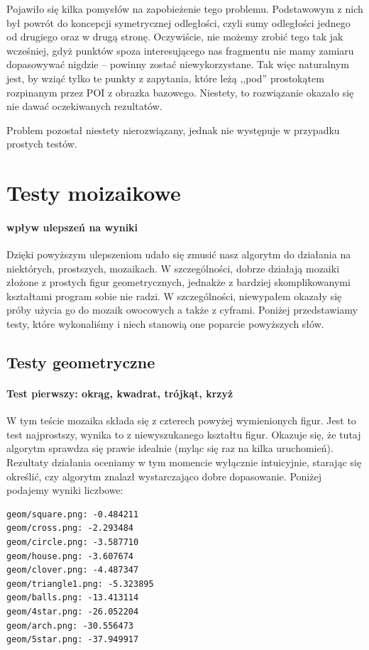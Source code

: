 \documentclass[a4paper,12pt,leqno]{article}
\begin{document}
Pojawiło się kilka pomysłów na zapobieżenie tego problemu. Podstawowym z nich był powrót do koncepcji symetrycznej odległości, czyli sumy odległości jednego od drugiego oraz w drugą stronę.
Oczywiście, nie możemy zrobić tego tak jak wcześniej, gdyż punktów spoza interesującego nas fragmentu nie mamy zamiaru dopasowywać nigdzie -- powinny zostać niewykorzystane.
Tak więc naturalnym jest, by wziąć tylko te punkty z zapytania, które leżą ,,pod'' prostokątem rozpinanym przez POI z obrazka bazowego. Niestety, to rozwiązanie okazało się nie dawać 
oczekiwanych rezultatów.

Problem pozostał niestety nierozwiązany, jednak nie występuje w przypadku prostych testów.

\section{Testy moizaikowe}
\paragraph{wpływ ulepszeń na wyniki}
Dzięki powyższym ulepszeniom udało się zmusić nasz algorytm do działania na niektórych, prostszych, mozaikach. W szczególności, dobrze działają mozaiki złożone z prostych figur geometrycznych,
jednakże z bardziej skomplikowanymi kształtami program sobie nie radzi. W szczególności, niewypałem okazały się próby użycia go do mozaik owocowych a także z cyframi.
Poniżej przedstawiamy testy, które wykonaliśmy i niech stanowią one poparcie powyższych słów.

\subsection{Testy geometryczne}
\paragraph{Test pierwszy: okrąg, kwadrat, trójkąt, krzyż}
W tym teście mozaika składa się z czterech powyżej wymienionych figur. Jest to test najprostszy, wynika to z niewyszukanego kształtu figur. Okazuje się, że tutaj algorytm sprawdza się prawie 
idealnie (myląc się raz na kilka uruchomień). Rezultaty działania oceniamy w tym momencie wyłącznie intuicyjnie, starając się określić, czy algorytm znalazł wystarczająco dobre dopasowanie.
Poniżej podajemy wyniki liczbowe:
\begin{verbatim}
geom/square.png: -0.484211
geom/cross.png: -2.293484
geom/circle.png: -3.587710
geom/house.png: -3.607674
geom/clover.png: -4.487347
geom/triangle1.png: -5.323895
geom/balls.png: -13.413114
geom/4star.png: -26.052204
geom/arch.png: -30.556473
geom/5star.png: -37.949917
\end{verbatim}
\end{document}
